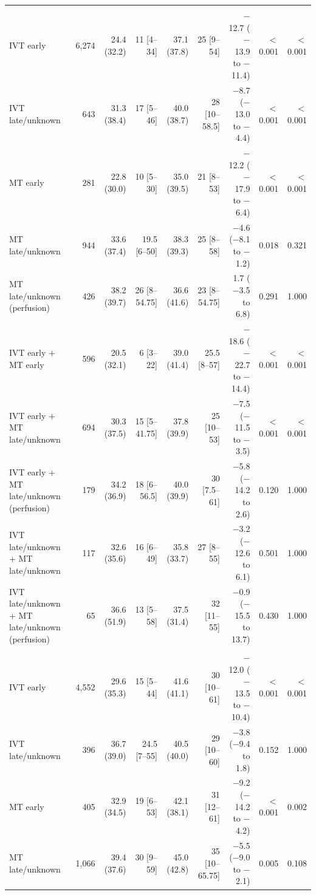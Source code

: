 \begin{landscape}
\begin{longtable}{p{5.6cm}rrrrrrrr}
\addlinespace
\multicolumn{9}{l}{\textbf{NIHSS 11--15}}\\
IVT early & 6,274 & 24.4 (32.2) & 11 [4--34] & 37.1 (37.8) & 25 [9--54] & $-$12.7 ($-$13.9 to $-$11.4) & $<$0.001 & $<$0.001 \\
IVT late/unknown & 643 & 31.3 (38.4) & 17 [5--46] & 40.0 (38.7) & 28 [10--58.5] & $-$8.7 ($-$13.0 to $-$4.4) & $<$0.001 & $<$0.001 \\
MT early & 281 & 22.8 (30.0) & 10 [5--30] & 35.0 (39.5) & 21 [8--53] & $-$12.2 ($-$17.9 to $-$6.4) & $<$0.001 & $<$0.001 \\
MT late/unknown & 944 & 33.6 (37.4) & 19.5 [6--50] & 38.3 (39.3) & 25 [8--58] & $-$4.6 ($-$8.1 to $-$1.2) & 0.018 & 0.321 \\
MT late/unknown (perfusion) & 426 & 38.2 (39.7) & 26 [8--54.75] & 36.6 (41.6) & 23 [8--54.75] & 1.7 ($-$3.5 to 6.8) & 0.291 & 1.000 \\
IVT early + MT early & 596 & 20.5 (32.1) & 6 [3--22] & 39.0 (41.4) & 25.5 [8--57] & $-$18.6 ($-$22.7 to $-$14.4) & $<$0.001 & $<$0.001 \\
IVT early + MT late/unknown & 694 & 30.3 (37.5) & 15 [5--41.75] & 37.8 (39.9) & 25 [10--53] & $-$7.5 ($-$11.5 to $-$3.5) & $<$0.001 & $<$0.001 \\
IVT early + MT late/unknown (perfusion) & 179 & 34.2 (36.9) & 18 [6--56.5] & 40.0 (39.9) & 30 [7.5--61] & $-$5.8 ($-$14.2 to 2.6) & 0.120 & 1.000 \\
IVT late/unknown + MT late/unknown & 117 & 32.6 (35.6) & 16 [6--49] & 35.8 (33.7) & 27 [8--55] & $-$3.2 ($-$12.6 to 6.1) & 0.501 & 1.000 \\
IVT late/unknown + MT late/unknown (perfusion) & 65 & 36.6 (51.9) & 13 [5--58] & 37.5 (31.4) & 32 [11--55] & $-$0.9 ($-$15.5 to 13.7) & 0.430 & 1.000 \\
\addlinespace
\multicolumn{9}{l}{\textbf{NIHSS 16--20}}\\
IVT early & 4,552 & 29.6 (35.3) & 15 [5--44] & 41.6 (41.1) & 30 [10--61] & $-$12.0 ($-$13.5 to $-$10.4) & $<$0.001 & $<$0.001 \\
IVT late/unknown & 396 & 36.7 (39.0) & 24.5 [7--55] & 40.5 (40.0) & 29 [10--60] & $-$3.8 ($-$9.4 to 1.8) & 0.152 & 1.000 \\
MT early & 405 & 32.9 (34.5) & 19 [6--53] & 42.1 (38.1) & 31 [12--61] & $-$9.2 ($-$14.2 to $-$4.2) & $<$0.001 & 0.002 \\
MT late/unknown & 1,066 & 39.4 (37.6) & 30 [9--59] & 45.0 (42.8) & 35 [10--65.75] & $-$5.5 ($-$9.0 to $-$2.1) & 0.005 & 0.108 \\

\end{longtable}
\end{landscape}
